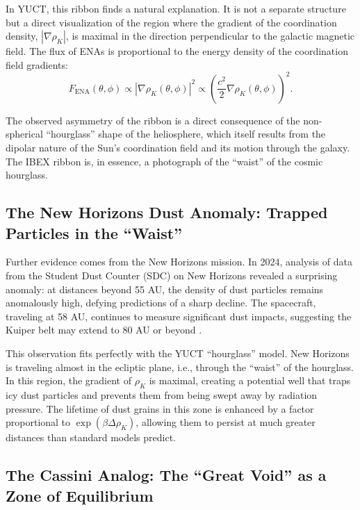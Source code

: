 \documentclass[12pt,a4paper]{article}
\theoremstyle{remark}
\begin{document}
	In YUCT, this ribbon finds a natural explanation. It is not a separate structure but a direct visualization of the region where the gradient of the coordination density, \(|\nabla \rho_K|\), is maximal in the direction perpendicular to the galactic magnetic field. The flux of ENAs is proportional to the energy density of the coordination field gradients:
	\begin{equation}
		F_{\text{ENA}}(\theta, \phi) \propto |\nabla \rho_K(\theta, \phi)|^2 \propto \left( \frac{c^2}{2} \nabla \rho_K(\theta, \phi) \right)^2.
		\label{eq:coord:ibex_flux}
	\end{equation}
	
	The observed asymmetry of the ribbon is a direct consequence of the non-spherical ``hourglass'' shape of the heliosphere, which itself results from the dipolar nature of the Sun's coordination field and its motion through the galaxy. The IBEX ribbon is, in essence, a photograph of the ``waist'' of the cosmic hourglass.
	
	\subsection{The New Horizons Dust Anomaly: Trapped Particles in the ``Waist''}
	\label{subsec:coord:newhorizons}
	
	Further evidence comes from the New Horizons mission. In 2024, analysis of data from the Student Dust Counter (SDC) on New Horizons revealed a surprising anomaly: at distances beyond 55 AU, the density of dust particles remains anomalously high, defying predictions of a sharp decline. The spacecraft, traveling at 58 AU, continues to measure significant dust impacts, suggesting the Kuiper belt may extend to 80 AU or beyond .
	
	This observation fits perfectly with the YUCT ``hourglass'' model. New Horizons is traveling almost in the ecliptic plane, i.e., through the ``waist'' of the hourglass. In this region, the gradient of \(\rho_K\) is maximal, creating a potential well that traps icy dust particles and prevents them from being swept away by radiation pressure. The lifetime of dust grains in this zone is enhanced by a factor proportional to \(\exp(\beta \Delta \rho_K)\), allowing them to persist at much greater distances than standard models predict.
	
	\subsection{The Cassini Analog: The ``Great Void'' as a Zone of Equilibrium}
	\label{subsec:coord:cassini}
	
\end{document}
